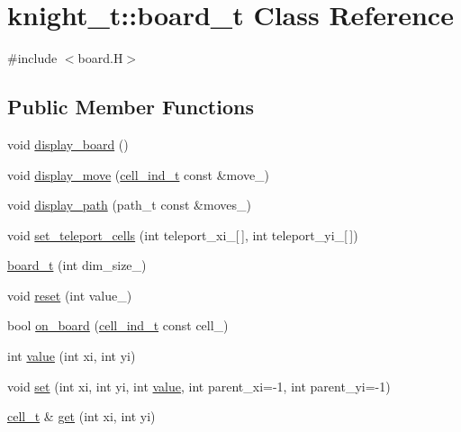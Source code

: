 \hypertarget{classknight__t_1_1board__t}{\section{knight\-\_\-t\-:\-:board\-\_\-t \-Class \-Reference}
\label{classknight__t_1_1board__t}
}


{\ttfamily \#include $<$board.\-H$>$}

\subsection*{\-Public \-Member \-Functions}
\begin{DoxyCompactItemize}
\item 
void \hyperlink{classknight__t_1_1board__t_a23079906cb89269c288689b4d95f9793}{display\-\_\-board} ()
\item 
void \hyperlink{classknight__t_1_1board__t_a6bd6eb1e0433e2ce3082eb4305fe252b}{display\-\_\-move} (\hyperlink{structknight__t_1_1cell__ind__t}{cell\-\_\-ind\-\_\-t} const \&move\-\_\-)
\item 
void \hyperlink{classknight__t_1_1board__t_ac7b3bc7fb3021a8db5ade95779b831ba}{display\-\_\-path} (path\-\_\-t const \&moves\-\_\-)
\item 
void \hyperlink{classknight__t_1_1board__t_a09090861cc5b6662ed419bf9c26f5828}{set\-\_\-teleport\-\_\-cells} (int teleport\-\_\-xi\-\_\-\mbox{[}$\,$\mbox{]}, int teleport\-\_\-yi\-\_\-\mbox{[}$\,$\mbox{]})
\item 
\hyperlink{classknight__t_1_1board__t_ab792d1acdd67c316ddbd272840a32644}{board\-\_\-t} (int dim\-\_\-size\-\_\-)
\item 
void \hyperlink{classknight__t_1_1board__t_afa5671cd678fdb5fc1d0cdc18f948c47}{reset} (int value\-\_\-)
\item 
bool \hyperlink{classknight__t_1_1board__t_a25e299e384fc634ff6f3e867aecb1fdc}{on\-\_\-board} (\hyperlink{structknight__t_1_1cell__ind__t}{cell\-\_\-ind\-\_\-t} const cell\-\_\-)
\item 
int \hyperlink{classknight__t_1_1board__t_a605947e4033dc9ff4ef27e12f03e02ed}{value} (int xi, int yi)
\item 
void \hyperlink{classknight__t_1_1board__t_a0a03b25fada09f6982524be4df2527a5}{set} (int xi, int yi, int \hyperlink{classknight__t_1_1board__t_a605947e4033dc9ff4ef27e12f03e02ed}{value}, int parent\-\_\-xi=-\/1, int parent\-\_\-yi=-\/1)
\item 
\hyperlink{structknight__t_1_1cell__t}{cell\-\_\-t} \& \hyperlink{classknight__t_1_1board__t_a77bd7ea5d14d126ae1c2306e3f074e6f}{get} (int xi, int yi)

\end{DoxyCompactItemize}
